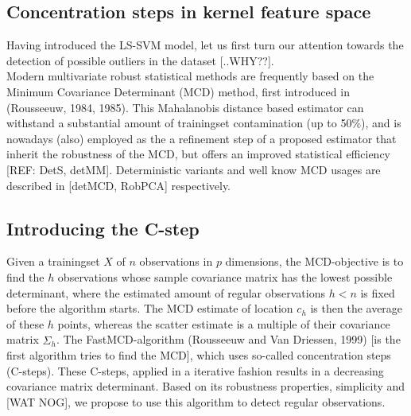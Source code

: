 \documentclass[preprint,12pt]{elsarticle}
\begin{document}
\newpage
\subsection{Concentration steps in kernel feature space}

Having introduced the LS-SVM model, let us first turn our attention towards the detection of possible outliers in the dataset [..WHY??]. \\

Modern multivariate robust statistical methods are frequently based on the Minimum Covariance Determinant (MCD) method, first introduced in  (Rousseeuw, 1984, 1985). This Mahalanobis distance based estimator can withstand a substantial amount of trainingset contamination (up to 50\%), and is nowadays (also) employed as the a refinement step of a proposed estimator that inherit the robustness of the MCD, but offers an improved statistical efficiency [REF: DetS, detMM]. Deterministic variants and well know MCD usages are described in [detMCD, RobPCA] respectively. 

\subsection{Introducing the C-step}

Given a trainingset $X$ of $n$ observations in $p$ dimensions, the MCD-objective is to find the $h$ observations whose sample covariance matrix has the lowest
possible determinant, where the estimated amount of regular observations $h < n$ is fixed before the algorithm starts. The MCD estimate of location $c_h$ is then the average of these $h$ points, whereas the scatter estimate is a multiple of their covariance matrix $\hat{\Sigma}_{h}$. The FastMCD-algorithm (Rousseeuw and Van Driessen, 1999) [is the first algorithm tries to find the MCD], which uses so-called concentration steps (C-steps). These C-steps, applied in a iterative fashion results in a decreasing covariance matrix determinant. Based on its robustness properties, simplicity and [WAT NOG], we propose to use this algorithm to detect regular observations.
\end{document}
